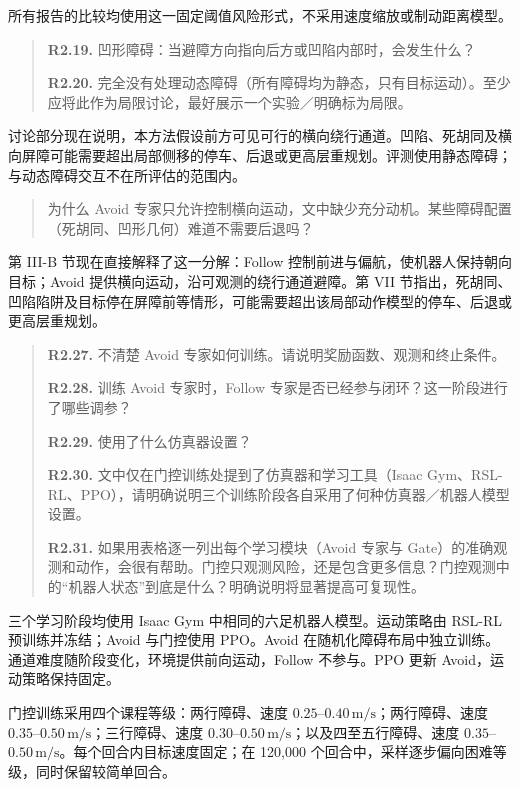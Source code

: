 所有报告的比较均使用这一固定阈值风险形式，不采用速度缩放或制动距离模型。

\begin{quote}
\textbf{R2.19.} 凹形障碍：当避障方向指向后方或凹陷内部时，会发生什么？

\textbf{R2.20.} 完全没有处理动态障碍（所有障碍均为静态，只有目标运动）。至少应将此作为局限讨论，最好展示一个实验／明确标为局限。
\end{quote}
\response
讨论部分现在说明，本方法假设前方可见可行的横向绕行通道。凹陷、死胡同及横向屏障可能需要超出局部侧移的停车、后退或更高层重规划。评测使用静态障碍；与动态障碍交互不在所评估的范围内。


\begin{quote}
为什么 Avoid 专家只允许控制横向运动，文中缺少充分动机。某些障碍配置（死胡同、凹形几何）难道不需要后退吗？
\end{quote}
\response
第 III-B 节现在直接解释了这一分解：Follow 控制前进与偏航，使机器人保持朝向目标；Avoid 提供横向运动，沿可观测的绕行通道避障。第 VII 节指出，死胡同、凹陷陷阱及目标停在屏障前等情形，可能需要超出该局部动作模型的停车、后退或更高层重规划。

\begin{quote}
\textbf{R2.27.} 不清楚 Avoid 专家如何训练。请说明奖励函数、观测和终止条件。

\textbf{R2.28.} 训练 Avoid 专家时，Follow 专家是否已经参与闭环？这一阶段进行了哪些调参？

\textbf{R2.29.} 使用了什么仿真器设置？

\textbf{R2.30.} 文中仅在门控训练处提到了仿真器和学习工具（Isaac Gym、RSL-RL、PPO），请明确说明三个训练阶段各自采用了何种仿真器／机器人模型设置。

\textbf{R2.31.} 如果用表格逐一列出每个学习模块（Avoid 专家与 Gate）的准确观测和动作，会很有帮助。门控只观测风险，还是包含更多信息？门控观测中的“机器人状态”到底是什么？明确说明将显著提高可复现性。
\end{quote}
\response
三个学习阶段均使用 Isaac Gym 中相同的六足机器人模型。运动策略由 RSL-RL 预训练并冻结；Avoid 与门控使用 PPO。Avoid 在随机化障碍布局中独立训练。通道难度随阶段变化，环境提供前向运动，Follow 不参与。PPO 更新 Avoid，运动策略保持固定。

门控训练采用四个课程等级：两行障碍、速度 $0.25$--$0.40\,\mathrm{m/s}$；两行障碍、速度 $0.35$--$0.50\,\mathrm{m/s}$；三行障碍、速度 $0.30$--$0.50\,\mathrm{m/s}$；以及四至五行障碍、速度 $0.35$--$0.50\,\mathrm{m/s}$。每个回合内目标速度固定；在 120,000 个回合中，采样逐步偏向困难等级，同时保留较简单回合。

